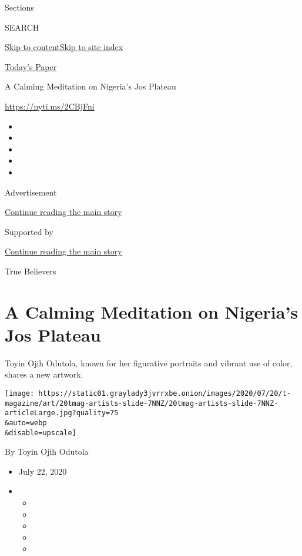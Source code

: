 Sections

SEARCH

\protect\hyperlink{site-content}{Skip to
content}\protect\hyperlink{site-index}{Skip to site index}

\href{https://myaccount.nytimes3xbfgragh.onion/auth/login?response_type=cookie\&client_id=vi}{}

\href{https://www.nytimes3xbfgragh.onion/section/todayspaper}{Today's
Paper}

A Calming Meditation on Nigeria's Jos Plateau

\url{https://nyti.ms/2CBjFni}

\begin{itemize}
\item
\item
\item
\item
\item
\end{itemize}

Advertisement

\protect\hyperlink{after-top}{Continue reading the main story}

Supported by

\protect\hyperlink{after-sponsor}{Continue reading the main story}

True Believers

\hypertarget{a-calming-meditation-on-nigerias-jos-plateau}{%
\section{A Calming Meditation on Nigeria's Jos
Plateau}\label{a-calming-meditation-on-nigerias-jos-plateau}}

Toyin Ojih Odutola, known for her figurative portraits and vibrant use
of color, shares a new artwork.

\texttt{[image: https://static01.graylady3jvrrxbe.onion/images/2020/07/20/t-magazine/art/20tmag-artists-slide-7NNZ/20tmag-artists-slide-7NNZ-articleLarge.jpg?quality=75\\\&auto=webp\\\&disable=upscale]}

By Toyin Ojih Odutola

\begin{itemize}
\item
  July 22, 2020
\item
  \begin{itemize}
  \item
  \item
  \item
  \item
  \item
  \end{itemize}
\end{itemize}

